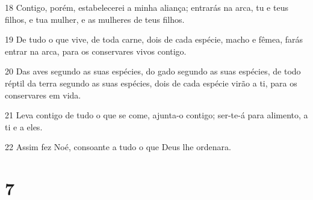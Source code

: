 \par 18 Contigo, porém, estabelecerei a minha aliança; entrarás na arca, tu e teus filhos, e tua mulher, e as mulheres de teus filhos.
\par 19 De tudo o que vive, de toda carne, dois de cada espécie, macho e fêmea, farás entrar na arca, para os conservares vivos contigo.
\par 20 Das aves segundo as suas espécies, do gado segundo as suas espécies, de todo réptil da terra segundo as suas espécies, dois de cada espécie virão a ti, para os conservares em vida.
\par 21 Leva contigo de tudo o que se come, ajunta-o contigo; ser-te-á para alimento, a ti e a eles.
\par 22 Assim fez Noé, consoante a tudo o que Deus lhe ordenara.

\chapter{7}

